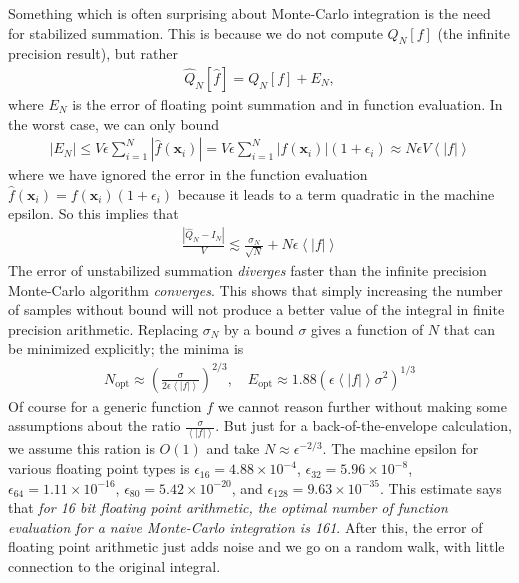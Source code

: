 \documentclass[landscape]{article}
\numberwithin{equation}{section}
\begin{document}
Something which is often surprising about Monte-Carlo integration is the need for stabilized summation.
This is because we do not compute $Q_{N}[f]$ (the infinite precision result), but rather 
\begin{align*}
\hat{Q}_{N}[\hat{f}] = Q_{N}[f] + E_{N},
\end{align*}
where $E_{N}$ is the error of floating point summation and in function evaluation.
In the worst case, we can only bound 
\begin{align*}
|E_{N}| \le V\epsilon \sum_{i=1}^{N} |\hat{f}(\mathbf{x}_{i})|  = V\epsilon \sum_{i=1}^{N} |f(\mathbf{x}_{i})|(1+\epsilon_{i}) \approx N\epsilon V \left< |f|\right>
\end{align*}
where we have ignored the error in the function evaluation $\hat{f}(\mathbf{x}_{i}) = f(\mathbf{x}_{i})(1+\epsilon_{i})$ because it leads to a term quadratic in the machine epsilon.
So this implies that
\begin{align*}
\frac{\left| \hat{Q}_{N}  - I_{N} \right|}{V}  \lesssim  \frac{\sigma_{N}}{\sqrt{N}} + N\epsilon \left< |f| \right>
\end{align*}
The error of unstabilized summation \emph{diverges} faster than the infinite precision Monte-Carlo algorithm \emph{converges}.
This shows that simply increasing the number of samples without bound will not produce a better value of the integral in finite precision arithmetic.
Replacing $\sigma_{N}$ by a bound $\sigma$ gives a function of $N$ that can be minimized explicitly; the minima is
\begin{align*}
N_{\mathrm{opt}} \approx \left( \frac{\sigma}{2\epsilon \left< |f|\right>} \right)^{2/3}, \quad E_{\mathrm{opt}} \approx 1.88(\epsilon\left<|f|\right>\sigma^2)^{1/3}
\end{align*}
Of course for a generic function $f$ we cannot reason further without making some assumptions about the ratio $\frac{\sigma}{\left<|f|\right>}$.
But just for a back-of-the-envelope calculation, we assume this ration is $O(1)$ and take $N \approx \epsilon^{-2/3}$.
The machine epsilon for various floating point types is $\epsilon_{16} = 4.88\times 10^{-4}$, $\epsilon_{32} = 5.96\times 10^{-8}$, $\epsilon_{64} = 1.11\times 10^{-16}$, $\epsilon_{80} = 5.42\times 10^{-20}$, and $\epsilon_{128} = 9.63\times 10^{-35}$.
This estimate says that \emph{for 16 bit floating point arithmetic, the optimal number of function evaluation for a naive Monte-Carlo integration is 161}.
After this, the error of floating point arithmetic just adds noise and we go on a random walk, with little connection to the original integral.
\end{document}
